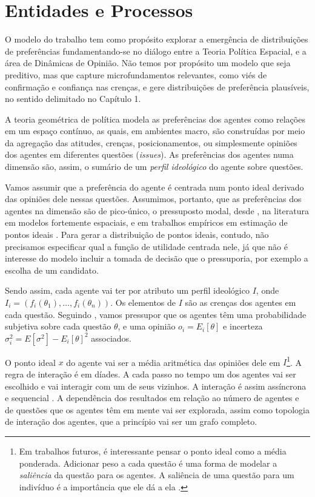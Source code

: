 
\section{Entidades e Processos}


O modelo do trabalho tem como propósito explorar a emergência de distribuições de
preferências fundamentando-se no diálogo entre a Teoria Política Espacial, e a
área de Dinâmicas de Opinião. Não temos por propósito um modelo que seja
preditivo, mas que capture microfundamentos relevantes, como viés de confirmação
e confiança nas crenças, e gere distribuições de
preferência plausíveis, no sentido delimitado no Capítulo 1.

A teoria geométrica de política modela as preferências dos agentes como relações
em um espaço contínuo, as quais, em ambientes macro, são construídas por meio da
agregação das atitudes, crenças, posicionamentos, ou simplesmente opiniões dos
agentes em diferentes questões (\textit{issues}). As preferências dos agentes
numa dimensão são, assim, o sumário de um \textit{perfil ideológico} do agente
sobre questões.

Vamos assumir que a preferência do agente é centrada num ponto ideal derivado
das opiniões dele nessas questões. Assumimos, portanto, que as preferências dos
agentes na dimensão são de pico-único, o pressuposto modal, desde
, na literatura em modelos fortemente espaciais, e
em trabalhos empíricos em estimação de pontos ideais \cite{carroll2013structure,
  armstrong2014analyzing, schofield1998nash}. Para gerar a distribuição de
pontos ideais, contudo, não precisamos especificar qual a função de utilidade
centrada nele, já que não é interesse do modelo incluir a tomada de decisão que
o pressuporia, por exemplo a escolha de um candidato.

Sendo assim, cada agente vai ter por atributo um perfil ideológico \(I\), onde
\(I_i = (f_i(\theta_1), \ldots, f_i(\theta_n)) \). Os elementos de \(I\) são as crenças dos
agentes em cada questão. Seguindo , vamos pressupor
que os agentes têm uma probabilidade subjetiva sobre cada questão \(\theta\), e uma
opinião \( o_i = E_i[\theta]\) e incerteza \( \sigma_i^2 = E[\sigma^2] - E_ i[\theta]^2\)
associados.

O ponto ideal \(x\) do agente vai ser a média aritmética das opiniões dele em
\(I\)\footnote{Em trabalhos futuros, é interessante pensar o ponto ideal como a
  média ponderada. Adicionar peso a cada questão é uma forma de modelar a
  \textit{saliência} da questão para os agentes. A saliência de uma questão para
  um indivíduo é a importância que ele dá a ela \cite{munger2015choosing}.}. A
regra de interação é em díades. A cada passo no tempo um dos agentes vai ser
escolhido e vai interagir com um de seus vizinhos. A interação é assim
assíncrona e sequencial \cite{wilensky2015introduction}. A dependência dos
resultados em relação ao número de agentes e de questões que os agentes têm em
mente vai ser explorada, assim como topologia de interação dos agentes, que a
princípio vai ser um grafo completo.

